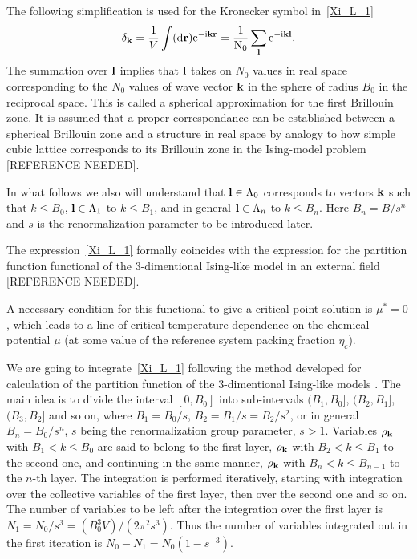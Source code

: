 The following simplification is used for the Kronecker symbol in~\eqref{Xi_L_1}
\begin{equation*}
	\delta_{\vb k} = \frac{1}{V} \int (\rm{d} \vb r) \rm{e}^{-{\rm i} \vb k \vb r} = \frac{1}{N_0}\sum_{\vb l} {\rm e}^{-{\rm i} \vb k \vb l}.
\end{equation*}
The summation over $\vb l$ implies that $\vb l$ takes on $N_0$ values in real space corresponding to the $N_0$ values of wave vector $\vb k$ in the sphere of radius $B_0$ in the reciprocal space. This is called a spherical approximation for the first Brillouin zone. It is assumed that a proper correspondance can be established between a spherical Brillouin zone and a structure in real space by analogy to how simple cubic lattice corresponds to its Brillouin zone in the Ising-model problem [REFERENCE NEEDED]. 

In what follows we also will understand that $\vb l \in \Lambda_0$ corresponds to vectors $\vb k$ such that $k \leq B_0$, $\vb l \in \Lambda_1$ to $k \leq B_1$, and in general $\vb l \in \Lambda_n$ to $k \leq B_n$. Here $B_n = B/s^n$ and $s$ is the renormalization parameter to be introduced later.

The expression~\eqref{Xi_L_1} formally coincides with the expression for the partition function functional of the 3-dimentional Ising-like model in an external field [REFERENCE NEEDED]. 

A necessary condition for this functional to give a critical-point solution is $\mu^* = 0$, which leads to a line of critical temperature dependence on the chemical potential $\mu$ (at some value of the reference system packing fraction $\eta_c$).

We are going to integrate~\eqref{Xi_L_1} following the method developed for calculation of the partition function of the 3-dimentional Ising-like models \cite{MpkCMP2005,Yukh1989riv}. The main idea is to divide the interval $[0, B_0]$ into sub-intervals $(B_1, B_0]$, $(B_2, B_1]$, $(B_3, B_2]$ and so on, where $B_1 = B_0/s$, $B_2 = B_1/s = B_2/s^2$, or in general $B_n = B_0/s^n$, $s$ being the renormalization group parameter, $s > 1.$ Variables $\rho_{\vb k}$ with $B_1 < k \leq B_0$ are said to belong to the first layer, $\rho_{\vb k}$ with $B_2 < k \leq B_1$ to the second one, and continuing in the same manner, $\rho_{\vb k}$ with $B_n < k \leq B_{n-1}$ to the $n$-th layer.
The integration is performed iteratively, starting with integration over the collective variables of the first layer, then over the second one and so on.
The number of variables to be left after the integration over the first layer is $N_1 = N_0 / s^3 = (B_0^3 V)/(2\pi^2 s^3)$. Thus the number of variables integrated out in the first iteration is $N_0 - N_1 = N_0(1-s^{-3})$.

